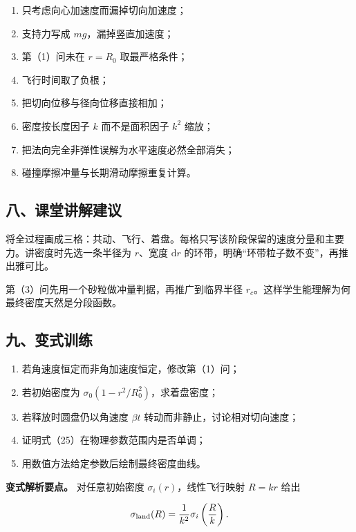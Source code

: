\documentclass[12pt,a4paper,UTF8]{ctexart}
\newcommand{\tightlist}{\setlength{\itemsep}{0pt}\setlength{\parskip}{0pt}}
\begin{document}
\begin{enumerate}
\def\labelenumi{\arabic{enumi}.}
\tightlist
\item
  只考虑向心加速度而漏掉切向加速度；
\item
  支持力写成 \(mg\)，漏掉竖直加速度；
\item
  第（1）问未在 \(r=R_0\) 取最严格条件；
\item
  飞行时间取了负根；
\item
  把切向位移与径向位移直接相加；
\item
  密度按长度因子 \(k\) 而不是面积因子 \(k^2\) 缩放；
\item
  把法向完全非弹性误解为水平速度必然全部消失；
\item
  碰撞摩擦冲量与长期滑动摩擦重复计算。
\end{enumerate}

\subsection{八、课堂讲解建议}\label{ux516bux8bfeux5802ux8bb2ux89e3ux5efaux8bae-2}

将全过程画成三格：共动、飞行、着盘。每格只写该阶段保留的速度分量和主要力。讲密度时先选一条半径为
\(r\)、宽度 \(\mathrm dr\)
的环带，明确``环带粒子数不变''，再推出雅可比。

第（3）问先用一个砂粒做冲量判据，再推广到临界半径
\(r_c\)。这样学生能理解为何最终密度天然是分段函数。

\subsection{九、变式训练}\label{ux4e5dux53d8ux5f0fux8badux7ec3-2}

\begin{enumerate}
\def\labelenumi{\arabic{enumi}.}
\tightlist
\item
  若角速度恒定而非角加速度恒定，修改第（1）问；
\item
  若初始密度为 \(\sigma_0(1-r^2/R_0^2)\)，求着盘密度；
\item
  若释放时圆盘仍以角速度 \(\beta t\) 转动而非静止，讨论相对切向速度；
\item
  证明式（25）在物理参数范围内是否单调；
\item
  用数值方法给定参数后绘制最终密度曲线。
\end{enumerate}

\textbf{变式解析要点。} 对任意初始密度 \(\sigma_i(r)\)，线性飞行映射
\(R=kr\) 给出

\[
\sigma_{\rm land}(R)
=\frac1{k^2}\sigma_i\left(\frac Rk\right).
\]
\end{document}
